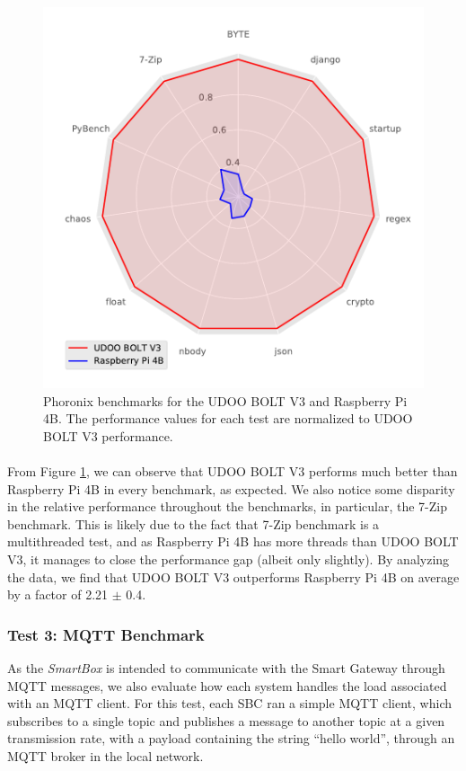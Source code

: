 \begin{figure}[H]
    \centering
    \includegraphics[width=0.8 \linewidth]{images/phoronix-benchmarks.pdf}
    \caption [Phoronix benchmarks for the UDOO BOLT V3 and Raspberry Pi 4B.]{ Phoronix benchmarks for the UDOO BOLT V3 and Raspberry Pi 4B. The performance values for each test are normalized to UDOO BOLT V3 performance.}
    \label{fig:phronix-benchmarks}
\end{figure}

\paragraph{} From Figure \ref{fig:phronix-benchmarks}, we can observe that UDOO BOLT V3 performs much better than Raspberry Pi 4B in every benchmark, as expected. We also notice some disparity in the relative performance throughout the benchmarks, in particular, the 7-Zip benchmark. This is likely due to the fact that 7-Zip benchmark is a multithreaded test, and as Raspberry Pi 4B has more threads than UDOO BOLT V3, it manages to close the performance gap (albeit only slightly). By analyzing the data, we find that UDOO BOLT V3 outperforms Raspberry Pi 4B on average by a factor of 2.21 $\pm$ 0.4.

\subsubsection{Test 3: \acs{MQTT} Benchmark}

As the \textit{SmartBox} is intended to communicate with the Smart Gateway through \acs{MQTT} messages, we also evaluate how each system handles the load associated with an \acs{MQTT} client. For this test, each \acs{SBC} ran a simple \acs{MQTT} client, which subscribes to a single topic and publishes a message to another topic at a given transmission rate, with a payload containing the string ``hello world'', through an \acs{MQTT} broker in the local network.

